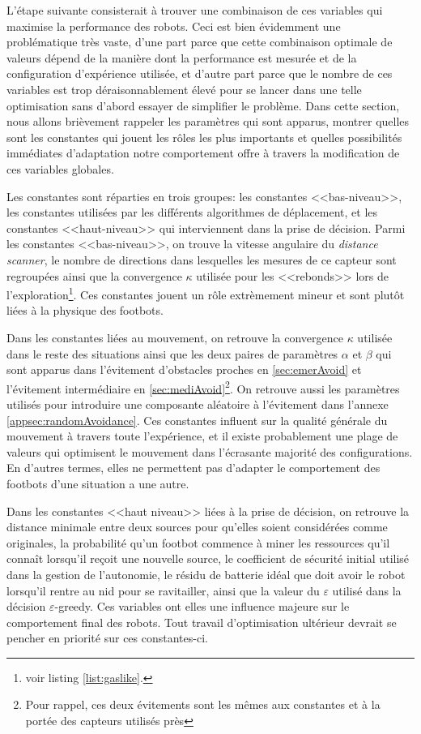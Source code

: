 L'étape suivante consisterait à trouver une combinaison de ces variables qui maximise la performance des robots. Ceci est bien évidemment une problématique très vaste, d'une part parce que cette combinaison optimale de valeurs dépend de la manière dont la performance est mesurée et de la configuration d'expérience utilisée, et d'autre part parce que le nombre de ces variables est trop déraisonnablement élevé pour se lancer dans une telle optimisation sans d'abord essayer de simplifier le problème. Dans cette section, nous allons brièvement rappeler les paramètres qui sont apparus, montrer quelles sont les constantes qui jouent les rôles les plus importants et quelles possibilités immédiates d'adaptation notre comportement offre à travers la modification de ces variables globales.

Les constantes sont réparties en trois groupes: les constantes <<bas-niveau>>, les constantes utilisées par les différents algorithmes de déplacement, et les constantes <<haut-niveau>> qui interviennent dans la prise de décision. Parmi les constantes <<bas-niveau>>, on trouve la vitesse angulaire du \emph{distance scanner}, le nombre de directions dans lesquelles les mesures de ce capteur sont regroupées ainsi que la convergence $\kappa$ utilisée pour les <<rebonds>> lors de l'exploration\footnote{voir listing \ref{list:gaslike}.}. Ces constantes jouent un rôle extrèmement mineur et sont plutôt liées à la physique des footbots.

Dans les constantes liées au mouvement, on retrouve la convergence $\kappa$ utilisée dans le reste des situations ainsi que les deux paires de paramètres $\alpha$ et $\beta$ qui sont apparus dans l'évitement d'obstacles proches en \ref{sec:emerAvoid} et l'évitement intermédiaire en \ref{sec:mediAvoid}\footnote{Pour rappel, ces deux évitements sont les mêmes aux constantes et à la portée des capteurs utilisés près}. On retrouve aussi les paramètres utilisés pour introduire une composante aléatoire à l'évitement dans l'annexe \ref{appsec:randomAvoidance}. Ces constantes influent sur la qualité générale du mouvement à travers toute l'expérience, et il existe probablement une plage de valeurs qui optimisent le mouvement dans l'écrasante majorité des configurations. En d'autres termes, elles ne permettent pas d'adapter le comportement des footbots d'une situation a une autre.

Dans les constantes <<haut niveau>> liées à la prise de décision, on retrouve la distance minimale entre deux sources pour qu'elles soient considérées comme originales, la probabilité qu'un footbot commence à miner les ressources qu'il connaît lorsqu'il reçoit une nouvelle source, le coefficient de sécurité initial utilisé dans la gestion de l'autonomie, le résidu de batterie idéal que doit avoir le robot lorsqu'il rentre au nid pour se ravitailler, ainsi que la valeur du $\varepsilon$ utilisé dans la décision $\varepsilon$-greedy. Ces variables ont elles une influence majeure sur le comportement final des robots. Tout travail d'optimisation ultérieur devrait se pencher en priorité sur ces constantes-ci.

